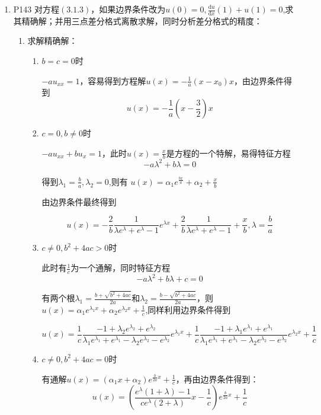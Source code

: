 \documentclass{ctexart}
\begin{document}
\begin{enumerate}
\item P143 对方程\((3.1.3)\)，如果边界条件改为\(u(0)=0, \frac{\mbox{d}u}{\mbox{d}x}(1)+u(1)=0 \),求其精确解；并用三点差分格式离散求解，同时分析差分格式的精度：

\begin{enumerate}

\item 求解精确解：

\begin{enumerate}
\item \(b=c=0\)时

 \(-au_{xx}=1\)，容易得到方程解\(u(x)=-\frac{1}{a}(x-x_0)x\)，由边界条件得到
 \[u(x)=-\frac{1}{a}(x-\frac{3}{2})x\]
 
 \item \(c=0,b\neq0 \)时
 
 \(-au_{xx}+bu_x=1\)，此时\(u(x)=\frac{x}{b}\)是方程的一个特解，易得特征方程
 \[-a\lambda^2+b\lambda=0\]
 
 得到\(\lambda_1=\frac{b}{a},\lambda_2=0\),则有 \(u(x)=\alpha_1 e^{\frac{bx}{a}}+\alpha_2+\frac{x}{b}\)
   
由边界条件最终得到

\[
u(x)=-\frac{2}{b}\frac{1}{\lambda e^{\lambda}+e^{\lambda}-1}e^{\lambda x}+\frac{2}{b}\frac{1}{\lambda e^{\lambda}+e^{\lambda}-1}+\frac{x}{b},\lambda=\frac{b}{a}
\]

\item \( c \neq 0 , b^2+4ac > 0\)时

此时有\(\frac{1}{c}\)为一个通解，同时特征方程
\[
-a \lambda^2+b \lambda +c =0\]

有两个根\(\lambda_1= \frac{b+\sqrt{b^2+4ac}}{2a}\)和\(\lambda_2= \frac{b-\sqrt{b^2+4ac}}{2a}\)，则\(u(x)=\alpha_1 e^{\lambda_1 x}+\alpha_2 e^{\lambda_2 x}+\frac{1}{c}\),同样利用边界条件得到

\[
u(x)=\frac{1}{c}\frac{-1+\lambda_2 e^{\lambda_2}+e^{\lambda_2}}{\lambda_1 e^{\lambda_1}+e^{\lambda_1}-\lambda_2 e^{\lambda_2}-e^{\lambda_2}} e^{\lambda_1 x}+\frac{1}{c}\frac{-1+\lambda_1 e^{\lambda_1}+e^{\lambda_1}}{\lambda_1 e^{\lambda_1}+e^{\lambda_1}-\lambda_2 e^{\lambda_2}-e^{\lambda_2}}e^{\lambda_2 x} +\frac{1}{c}
\]

\item \( c \neq 0 , b^2+4ac = 0\)时

有通解\(u(x)=(\alpha_1 x+\alpha_2)e^{\frac{b}{2a}x}+\frac{1}{c}\)，再由边界条件得到：
\[
u(x)=( \frac{e^{\lambda}(1+\lambda)-1}{c e^{\lambda}(2+\lambda)}x-\frac{1}{c})e^{\frac{b}{2a}x}+\frac{1}{c}
\]



\end{enumerate}
\end{enumerate}
\end{enumerate}
\end{document}
